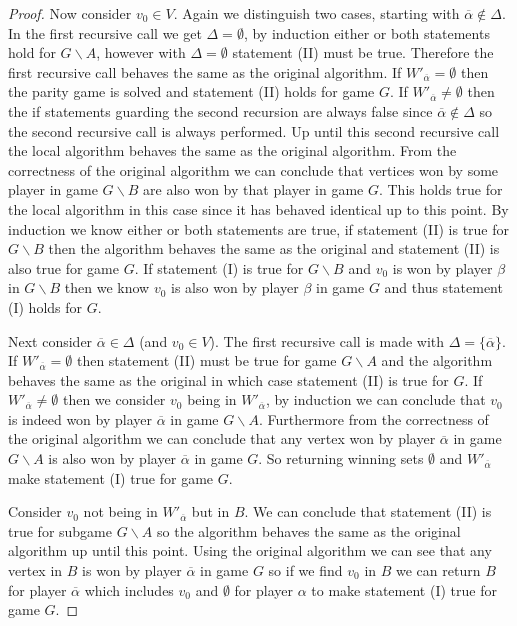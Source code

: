 \begin{theorem}
\begin{proof}
	Now consider $v_0 \in V$. Again we distinguish two cases, starting with $\overline{\alpha} \notin \Delta$. In the first recursive call we get $\Delta = \emptyset$, by induction either or both statements hold for $G\backslash A$, however with $\Delta = \emptyset$ statement (II) must be true. Therefore the first recursive call behaves the same as the original algorithm. If $W'_{\overline{\alpha}} = \emptyset$ then the parity game is solved and statement (II) holds for game $G$. If $W'_{\overline{\alpha}} \neq \emptyset$ then the if statements guarding the second recursion are always false since $\overline{\alpha} \notin \Delta$ so the second recursive call is always performed. Up until this second recursive call the local algorithm behaves the same as the original algorithm. From the correctness of the original algorithm we can conclude that vertices won by some player in game $G\backslash B$ are also won by that player in game $G$. This holds true for the local algorithm in this case since it has behaved identical up to this point. By induction we know either or both statements are true, if statement (II) is true for $G\backslash B$ then the algorithm behaves the same as the original and statement (II) is also true for game $G$. If statement (I) is true for $G \backslash B$ and $v_0$ is won by player $\beta$ in $G\backslash B$ then we know $v_0$ is also won by player $\beta$ in game $G$ and thus statement (I) holds for $G$.
	
	Next consider $\overline{\alpha} \in \Delta$ (and $v_0 \in V$). The first recursive call is made with $\Delta = \{\overline{\alpha}\}$. If $W'_{\overline{\alpha}} = \emptyset$ then statement (II) must be true for game $G\backslash A$ and the algorithm behaves the same as the original in which case statement (II) is true for $G$. If $W'_{\overline{\alpha}} \neq \emptyset$ then we consider $v_0$ being in $W'_{\overline{\alpha}}$, by induction we can conclude that $v_0$ is indeed won by player $\overline{\alpha}$ in game $G\backslash A$. Furthermore from the correctness of the original algorithm we can conclude that any vertex won by player $\overline{\alpha}$ in game $G\backslash A$ is also won by player $\overline{\alpha}$ in game $G$. So returning winning sets $\emptyset$ and $W'_{\overline{\alpha}}$ make statement (I) true for game $G$.
	
	Consider $v_0$ not being in $W'_{\overline{\alpha}}$ but in $B$. We can conclude that statement (II) is true for subgame $G\backslash A$ so the algorithm behaves the same as the original algorithm up until this point. Using the original algorithm we can see that any vertex in $B$ is won by player $\overline{\alpha}$ in game $G$ so if we find $v_0$ in $B$ we can return $B$ for player $\overline{\alpha}$ which includes $v_0$ and $\emptyset$ for player $\alpha$ to make statement (I) true for game $G$.
	

\end{proof}
\end{theorem}
